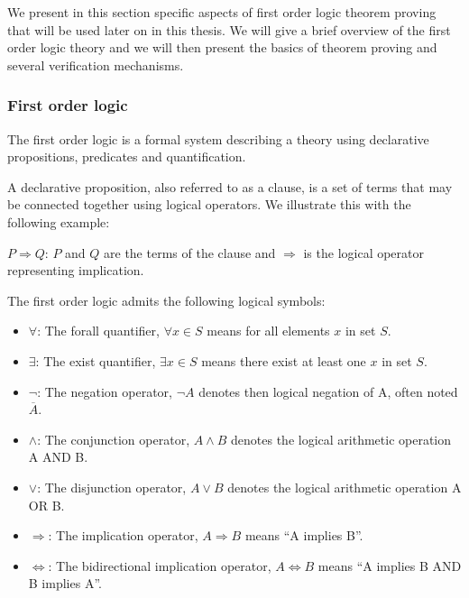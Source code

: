 \label{sec:proving-theory}
We present in this section specific aspects of first order logic theorem proving that will be used later on in this thesis. We will give a brief overview of the first order logic theory and we will then present the basics of theorem proving and several verification mechanisms.

\subsubsection{First order logic}
The first order logic is a formal system describing a theory using declarative propositions, predicates and quantification.

A declarative proposition, also referred to as a clause, is a set of terms  that may be connected together using logical operators.
We illustrate this with the following example:

$P \Rightarrow Q$: $P$ and $Q$ are the terms of the clause and $\Rightarrow$ is the logical operator representing implication.

The first order logic admits the following logical symbols:

\begin{itemize}
    \item $\forall$: The forall quantifier, $\forall x\in S$ means for all elements $x$ in set $S$. 
    \item $\exists$: The exist quantifier, $\exists x\in S$ means there exist at least one $x$ in set $S$.
    \item $\neg$: The negation operator, $\neg A$ denotes then logical negation of A, often noted $\overline{A}$.
    \item $\wedge$: The conjunction operator, $A \wedge B$ denotes the logical arithmetic operation A AND B.
    \item $\vee$: The disjunction operator, $A \vee B$ denotes the logical arithmetic operation A OR B.
    \item $\Rightarrow$: The implication operator, $A \Rightarrow B$ means ``A implies B''.
    \item $\Leftrightarrow$: The bidirectional implication operator, $A \Leftrightarrow B$ means ``A implies B AND B implies A''.
\end{itemize}

